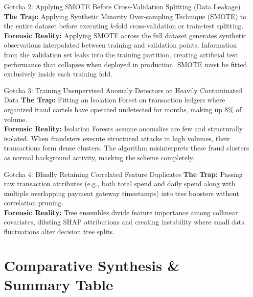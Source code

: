 \begin{trapbox}{Gotcha 2: Applying SMOTE Before Cross-Validation Splitting (Data Leakage)}
\textbf{The Trap:} Applying Synthetic Minority Over-sampling Technique (SMOTE) to the entire dataset before executing $k$-fold cross-validation or train-test splitting.\\
\textbf{Forensic Reality:} Applying SMOTE across the full dataset generates synthetic observations interpolated between training and validation points. Information from the validation set leaks into the training partition, creating artificial test performance that collapses when deployed in production. SMOTE must be fitted exclusively inside each training fold.
\end{trapbox}

\begin{trapbox}{Gotcha 3: Training Unsupervised Anomaly Detectors on Heavily Contaminated Data}
\textbf{The Trap:} Fitting an Isolation Forest on transaction ledgers where organized fraud cartels have operated undetected for months, making up $8\%$ of volume.\\
\textbf{Forensic Reality:} Isolation Forests assume anomalies are few and structurally isolated. When fraudsters execute structured attacks in high volumes, their transactions form dense clusters. The algorithm misinterprets these fraud clusters as normal background activity, masking the scheme completely.
\end{trapbox}

\begin{trapbox}{Gotcha 4: Blindly Retaining Correlated Feature Duplicates}
\textbf{The Trap:} Passing raw transaction attributes (e.g., both total spend and daily spend along with multiple overlapping payment gateway timestamps) into tree boosters without correlation pruning.\\
\textbf{Forensic Reality:} Tree ensembles divide feature importance among collinear covariates, diluting SHAP attributions and creating instability where small data fluctuations alter decision tree splits.
\end{trapbox}

\section{Comparative Synthesis \& Summary Table}

